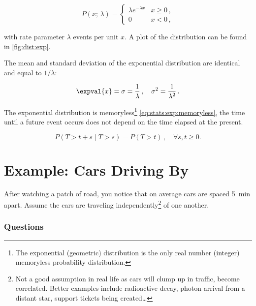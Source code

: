 \begin{equation}\label{eq:stats:exp:P}
P\left(x;\,\lambda\right) = \begin{cases}
\lambda e^{-\lambda x} & x \geq 0 \,, \\
0 & x < 0 \,,
\end{cases}
\end{equation}

\noindent with rate parameter $\lambda$ events per unit $x$.
A plot of the distribution can be found in \cref{fig:dist:exp}.

The mean and standard deviation of the exponential distribution are identical and equal to $1/\lambda$:

\begin{equation}\label{eq:stats:exp:mean_variance}
\expval{x} = \sigma = \frac{1}{\lambda}\,, \quad \sigma^{2} = \frac{1}{\lambda^{2}}\,.
\end{equation}

The exponential distribution is memoryless\footnote{The exponential (geometric) distribution is the only real number (integer) memoryless probability distribution.} \cref{eq:stats:exp:memoryless},
\ie the time until a future event occurs does not depend on the time elapsed at the present.

\begin{equation}\label{eq:stats:exp:memoryless}
P\left(T > t + s \mid T > s\right) = P\left(T > t\right)\,, \quad \forall s,t \geq 0.
\end{equation}

\section{Example: Cars Driving By}
\label{stats:cars}

After watching a patch of road,
you notice that on average cars are spaced \SI{5}{\minute} apart.
Assume the cars are traveling independently\footnote{Not a good assumption
in real life as cars will clump up in traffic, \ie become correlated.
Better examples include
radioactive decay,
photon arrival from a distant star,
support tickets being created\ldots} of one another.

\subsubsection{Questions}
\label{stats:cars:questions}

